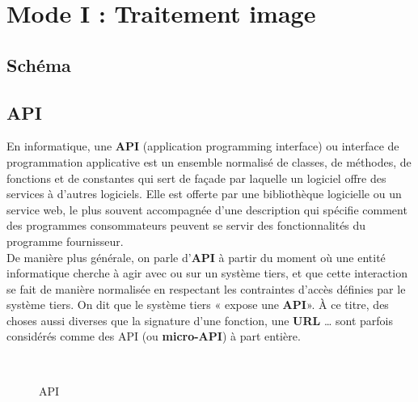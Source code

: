 {\section{Mode I : Traitement image}\thispagestyle{fancy}
\subsection{Schéma}
\subsection{API}
En informatique, une \textbf{API} (application programming interface) ou interface de programmation applicative est un ensemble normalisé de classes, de méthodes, de fonctions et de constantes qui sert de façade par laquelle un logiciel offre des services à d'autres logiciels. Elle est offerte par une bibliothèque logicielle ou un service web, le plus souvent accompagnée d'une description qui spécifie comment des programmes consommateurs peuvent se servir des fonctionnalités du programme fournisseur.\\[0.5cm]

De manière plus générale, on parle d'\textbf{API} à partir du moment où une entité informatique cherche à agir avec ou sur un système tiers, et que cette interaction se fait de manière normalisée en respectant les contraintes d'accès définies par le système tiers. On dit que le système tiers « expose une \textbf{API}». À ce titre, des choses aussi diverses que la signature d'une fonction, une \textbf{URL} … sont parfois considérés comme des API (ou \textbf{micro-API}) à part entière.\\[0.5cm]

\begin{figure}[H] 
\centering
{}\\[0.5cm]
\caption{API}
\label{fig:figure7}
\end{figure}

}

